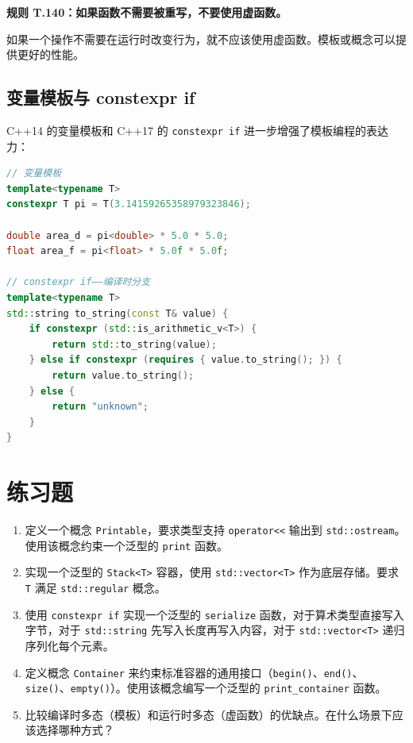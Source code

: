 \textbf{规则 T.140：如果函数不需要被重写，不要使用虚函数。}

如果一个操作不需要在运行时改变行为，就不应该使用虚函数。模板或概念可以提供更好的性能。

\subsection{变量模板与 constexpr if}

C++14 的变量模板和 C++17 的 \texttt{constexpr if} 进一步增强了模板编程的表达力：

\begin{lstlisting}[language=C++]
// 变量模板
template<typename T>
constexpr T pi = T(3.14159265358979323846);

double area_d = pi<double> * 5.0 * 5.0;
float area_f = pi<float> * 5.0f * 5.0f;

// constexpr if——编译时分支
template<typename T>
std::string to_string(const T& value) {
    if constexpr (std::is_arithmetic_v<T>) {
        return std::to_string(value);
    } else if constexpr (requires { value.to_string(); }) {
        return value.to_string();
    } else {
        return "unknown";
    }
}
\end{lstlisting}

\section*{练习题}

\begin{enumerate}
  \item 定义一个概念 \texttt{Printable}，要求类型支持 \texttt{operator<<} 输出到 \texttt{std::ostream}。使用该概念约束一个泛型的 \texttt{print} 函数。
  \item 实现一个泛型的 \texttt{Stack<T>} 容器，使用 \texttt{std::vector<T>} 作为底层存储。要求 \texttt{T} 满足 \texttt{std::regular} 概念。
  \item 使用 \texttt{constexpr if} 实现一个泛型的 \texttt{serialize} 函数，对于算术类型直接写入字节，对于 \texttt{std::string} 先写入长度再写入内容，对于 \texttt{std::vector<T>} 递归序列化每个元素。
  \item 定义概念 \texttt{Container} 来约束标准容器的通用接口（\texttt{begin()}、\texttt{end()}、\texttt{size()}、\texttt{empty()}）。使用该概念编写一个泛型的 \texttt{print\_container} 函数。
  \item 比较编译时多态（模板）和运行时多态（虚函数）的优缺点。在什么场景下应该选择哪种方式？
\end{enumerate}
